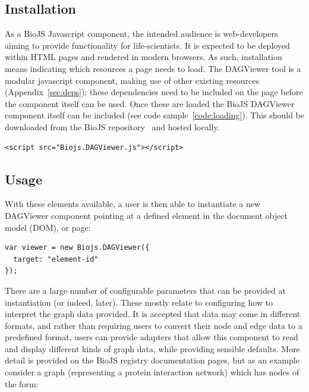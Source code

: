 \documentclass[10pt,a4paper,twocolumn]{article}
\begin{document}
\subsection*{Installation}

As a BioJS Javascript component, the intended audience is web-developers aiming
to provide functionality for life-scientists. It is expected to be deployed
within HTML pages and rendered in modern browsers. As such,
installation means indicating which resources a page needs to load.  The
DAGViewer tool is a modular javascript component, making use of other existing
resources (Appendix~\ref{sec:deps}); these dependencies need to be
included on the page before the component itself can be used.  Once these are
loaded the BioJS DAGViewer component itself can be included (see code
sample~\ref{code:loading}).  This should be downloaded from the BioJS
repository~\cite{site:biojs-registry} and hosted locally.

\begin{lstlisting}[caption={Loading the DAG-Viewer Library}, label={code:loading}]
<script src="Biojs.DAGViewer.js"></script>
\end{lstlisting}

\subsection*{Usage}

With these elements available, a user is then able to instantiate a new
DAGViewer component pointing at a defined element in the document object model
(DOM), or page:

\begin{lstlisting}[caption={Instantiating a new DAGViewer Component}, label={code:new}]
var viewer = new Biojs.DAGViewer({
  target: "element-id"
});
\end{lstlisting}

There are a large number of configurable parameters that can be provided at
instantiation (or indeed, later). These mostly relate to configuring how to
interpret the graph data provided. It is accepted that data may come in
different formats, and rather than requiring users to convert their node and
edge data to a predefined format, users can provide adapters that allow this
component to read and display different kinds of graph data, while providing
sensible defaults. More detail is provided on the BioJS registry documentation
pages, but as an example consider a graph (representing a protein interaction
network) which has nodes of the form:
\end{document}

